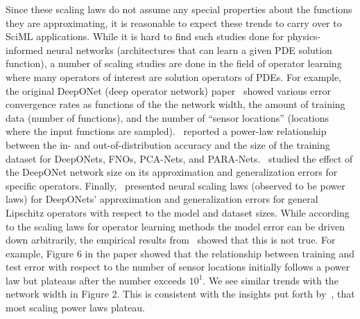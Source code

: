 \documentclass[12pt]{exam}
\begin{document}
\begin{questions}
Since these scaling laws do not assume any special properties about the functions they are approximating, it is reasonable to expect these trends to carry over to SciML applications. While it is hard to find such studies done for physics-informed neural networks (architectures that can learn a given PDE solution function), a number of scaling studies are done in the field of operator learning where many operators of interest are solution operators of PDEs. For example, the original DeepONet (deep operator network) paper~\citep{lu2019deeponet} showed various error convergence rates as functions of the the network width, the amount of training data (number of functions), and the number of ``sensor locations'' (locations where the input functions are sampled).~\citep{de2022cost} reported a power-law relationship between the in- and out-of-distribution accuracy and the size of the training dataset for DeepONets, FNOs, PCA-Nets, and PARA-Nets.~\citep{lanthaler2022error} studied the effect of the DeepONet network size on its approximation and generalization errors for specific operators. Finally,~\citep{liu2024neural} presented neural scaling laws (observed to be power laws) for DeepONets' approximation and generalization errors for general Lipschitz operators with respect to the model and dataset sizes. While according to the scaling laws for operator learning methods the model error can be driven down arbitrarily, the empirical results from~\citep{lu2019deeponet} showed that this is not true. For example, Figure 6 in the paper showed that the relationship between training and test error with respect to the number of sensor locations initially follows a power law but plateaus after the number exceeds $10^1$. We see similar trends with the network width in Figure 2. This is consistent with the insights put forth by~\citep{kaplan2020scaling}, that most scaling power laws plateau.


\end{questions}
\end{document}
